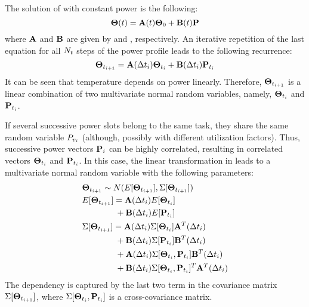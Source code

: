 The solution of  with constant power is the following:
\[
  \mathbf{\Theta}(t) = \mathbf{A}(t) \mathbf{\Theta}_0 + \mathbf{B}(t) \mathbf{P}
\]
where $\mathbf{A}$ and $\mathbf{B}$ are given by  and , respectively. An iterative repetition of the last equation for all $N_t$ steps of the power profile leads to the following recurrence:
\begin{equation} \equlabel{fourier-recurrence}
  \vtemperature_{\time_{i + 1}} = \m{A}(\timeinterval_i) \vtemperature_{\time_i} + \m{B}(\timeinterval_i) \vpower_{\time_i}
\end{equation}
It can be seen that temperature depends on power linearly. Therefore, $\mathbf{\Theta}_{t_{i + 1}}$ is a linear combination of two multivariate normal random variables, namely, $\mathbf{\Theta}_{t_i}$ and $\mathbf{P}_{t_i}$.

If several successive power slots belong to the same task, they share the same random variable $P_{v_i}$ (although, possibly with different utilization factors). Thus, successive power vectors $\mathbf{P}_i$ can be highly correlated, resulting in correlated vectors $\mathbf{\Theta}_{t_i}$ and $\mathbf{P}_{t_i}$. In this case, the linear transformation in  leads to a multivariate normal random variable with the following parameters:
\begin{align*}
  & \mathbf{\Theta}_{t_{i + 1}} \sim N(E[\mathbf{\Theta}_{t_{i + 1}}], \Sigma[\mathbf{\Theta}_{t_{i + 1}}]) \\
  & E[\mathbf{\Theta}_{t_{i + 1}}] = \mathbf{A}(\Delta t_i) E[\mathbf{\Theta}_{t_i}] \\
  & \qquad \qquad {} + \mathbf{B}(\Delta t_i) E[\mathbf{P}_{t_i}] \\
  & \Sigma[\mathbf{\Theta}_{t_{i + 1}}] = \mathbf{A}(\Delta t_i) \Sigma[\mathbf{\Theta}_{t_i}] \mathbf{A}^T(\Delta t_i) \\
  & \qquad \qquad {} + \mathbf{B}(\Delta t_i) \Sigma[\mathbf{P}_{t_i}] \mathbf{B}^T(\Delta t_i) \\
  & \qquad \qquad {} + \mathbf{A}(\Delta t_i) \Sigma[\mathbf{\Theta}_{t_i}, \mathbf{P}_{t_i}] \mathbf{B}^T(\Delta t_i) \\
  & \qquad \qquad {} + \mathbf{B}(\Delta t_i) \Sigma[\mathbf{\Theta}_{t_i}, \mathbf{P}_{t_i}]^T \mathbf{A}^T(\Delta t_i)
\end{align*}
The dependency is captured by the last two term in the covariance matrix $\Sigma[\mathbf{\Theta}_{t_{i + 1}}]$, where $\Sigma[\mathbf{\Theta}_{t_i}, \mathbf{P}_{t_i}]$ is a cross-covariance matrix.

